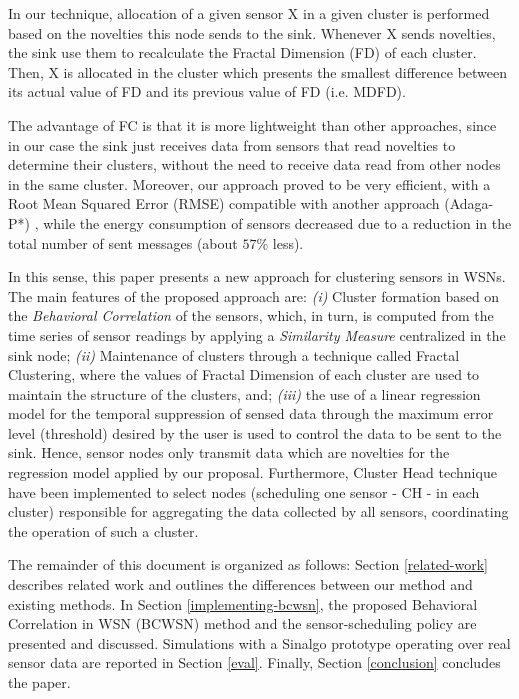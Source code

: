 \documentclass{acm_proc_article-sp}
\begin{document}
In our technique, allocation of a given sensor X in a given cluster is performed
based on the novelties this node sends to the sink. Whenever X sends novelties,
the sink use them to recalculate the Fractal Dimension (FD) of each cluster.
Then, X is allocated in the cluster which presents the smallest difference
between its actual value of FD and its previous value of FD (i.e. MDFD).
\vspace*{-.3cm}

The advantage of FC is that it is more lightweight than other approaches, since in 
our case the sink just receives data from sensors that read novelties to determine their 
clusters, without the need to receive data read from other nodes in the same cluster.
Moreover, our approach proved to be very efficient, with a Root Mean Squared Error (RMSE)
compatible with another approach (Adaga-P*)  \cite{MaiaSAC2013, MaiaACR2013}, while the 
energy consumption of sensors decreased due to a reduction in the total number of sent 
messages (about $57\%$ less).
\vspace*{-.3cm}

In this sense, this paper presents a new approach for clustering sensors in
WSNs. The main features of the proposed approach are: {\it (i)} Cluster
formation based on the \textit{Behavioral Correlation} of the sensors, which, in
turn, is computed from the time series of sensor readings by applying a
\textit{Similarity Measure} centralized in the sink node; {\it (ii)} Maintenance
of clusters through a technique called Fractal Clustering, where the values of
Fractal Dimension of each cluster are used to maintain the structure of the
clusters, and; {\it (iii)} the use of a linear regression model for the temporal
suppression of sensed data through the maximum error level (threshold) desired
by the user is used to control the data to be sent to the sink. Hence, sensor
nodes only transmit data which are novelties for the regression model applied by
our proposal. Furthermore, Cluster Head technique have been implemented to
select nodes (scheduling one sensor - CH - in each cluster) responsible for
aggregating the data collected by all sensors, coordinating the operation of
such a cluster.
\vspace*{-.3cm}

The remainder of this document is organized as follows: Section
\ref{related-work} describes related work and outlines the differences between
our method and existing methods. In Section \ref{implementing-bcwsn}, the
proposed Behavioral Correlation in WSN (BCWSN) method and the sensor-scheduling
policy are presented and discussed. Simulations with a Sinalgo prototype
operating over real sensor data are reported in Section \ref{eval}. Finally,
Section \ref{conclusion} concludes the paper.
\end{document}
